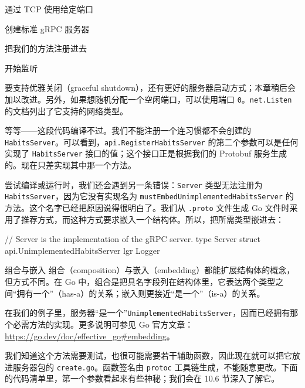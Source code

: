 \begin{codeannotations}
\item 通过 TCP 使用给定端口
\item 创建标准 gRPC 服务器
\item 把我们的方法注册进去
\item 开始监听
\end{codeannotations}

要支持优雅关闭（graceful shutdown），还有更好的服务器启动方式；本章稍后会加以改进。另外，如果想随机分配一个空闲端口，可以使用端口 \texttt{0}。\texttt{net.Listen} 的文档列出了它支持的网络类型。

等等——这段代码编译不过。我们不能注册一个连习惯都不会创建的 \texttt{HabitsServer}。可以看到，\texttt{api.RegisterHabitsServer} 的第二个参数可以是任何实现了 \texttt{HabitsServer} 接口的值；这个接口正是根据我们的 Protobuf 服务生成的。现在只差实现其中那一个方法。

尝试编译或运行时，我们还会遇到另一条错误：\texttt{Server} 类型无法注册为 \texttt{HabitsServer}，因为它没有实现名为 \texttt{mustEmbedUnimplementedHabitsServer} 的方法。这个名字已经把原因说得很明白了。我们从 \texttt{.proto} 文件生成 Go 文件时采用了推荐方式，而这种方式要求嵌入一个结构体。所以，把所需类型嵌进去：

\begin{gocode}[]
// Server is the implementation of the gRPC server.
type Server struct {
    api.UnimplementedHabitsServer
    lgr Logger
}
\end{gocode}

\begin{infobox}{组合与嵌入}
组合（composition）与嵌入（embedding）都能扩展结构体的概念，但方式不同。在 Go 中，组合是把具名字段列在结构体里，它表达两个类型之间“拥有一个”（has-a）的关系；嵌入则更接近“是一个”（is-a）的关系。

在我们的例子里，服务器“是一个”\texttt{UnimplementedHabitsServer}，因而已经拥有那个必需方法的实现。更多说明可参见 Go 官方文章：\url{https://go.dev/doc/effective_go#embedding}。
\end{infobox}

我们知道这个方法需要测试，也很可能需要若干辅助函数，因此现在就可以把它放进服务器包的 \texttt{create.go}。函数签名由 \texttt{protoc} 工具链生成，不能随意更改。下面的代码清单里，第一个参数看起来有些神秘；我们会在 10.6 节深入了解它。



